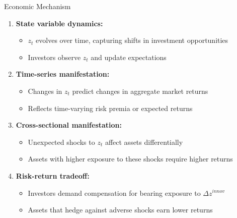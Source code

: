 \documentclass{beamer}
\begin{document}
\begin{frame}{Economic Mechanism}
\begin{enumerate}
\item \textbf{State variable dynamics:}
\begin{itemize}
\item $z_t$ evolves over time, capturing shifts in investment opportunities
\item Investors observe $z_t$ and update expectations
\end{itemize}
\vspace{0.2cm}

\item \textbf{Time-series manifestation:}
\begin{itemize}
\item Changes in $z_t$ predict changes in aggregate market returns
\item Reflects time-varying risk premia or expected returns
\end{itemize}
\vspace{0.2cm}

\item \textbf{Cross-sectional manifestation:}
\begin{itemize}
\item Unexpected shocks to $z_t$ affect assets differentially
\item Assets with higher exposure to these shocks require higher returns
\end{itemize}
\vspace{0.2cm}

\item \textbf{Risk-return tradeoff:}
\begin{itemize}
\item Investors demand compensation for bearing exposure to $\Delta z^{innov}$
\item Assets that hedge against adverse shocks earn lower returns
\end{itemize}
\end{enumerate}
\end{frame}
\end{document}
